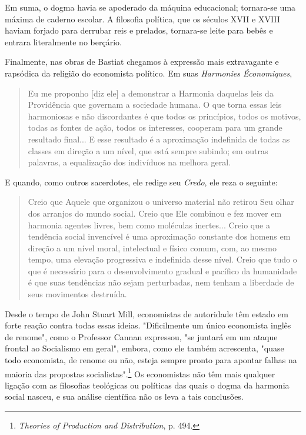 \documentclass[12pt]{article}
\begin{document}
Em suma, o dogma havia se apoderado da máquina educacional; tornara-se uma máxima de caderno escolar. A filosofia política, que os séculos XVII e XVIII haviam forjado para derrubar reis e prelados, tornara-se leite para bebês e entrara literalmente no berçário.

Finalmente, nas obras de Bastiat chegamos à expressão mais extravagante e rapsódica da religião do economista político. Em suas \textit{Harmonies Économiques},

\begin{quote}
Eu me proponho [diz ele] a demonstrar a Harmonia daquelas leis da Providência que governam a sociedade humana. O que torna essas leis harmoniosas e não discordantes é que todos os princípios, todos os motivos, todas as fontes de ação, todos os interesses, cooperam para um grande resultado final... E esse resultado é a aproximação indefinida de todas as classes em direção a um nível, que está sempre subindo; em outras palavras, a equalização dos indivíduos na melhora geral.
\end{quote}

E quando, como outros sacerdotes, ele redige seu \textit{Credo}, ele reza o seguinte:

\begin{quote}
Creio que Aquele que organizou o universo material não retirou Seu olhar dos arranjos do mundo social. Creio que Ele combinou e fez mover em harmonia agentes livres, bem como moléculas inertes... Creio que a tendência social invencível é uma aproximação constante dos homens em direção a um nível moral, intelectual e físico comum, com, ao mesmo tempo, uma elevação progressiva e indefinida desse nível. Creio que tudo o que é necessário para o desenvolvimento gradual e pacífico da humanidade é que suas tendências não sejam perturbadas, nem tenham a liberdade de seus movimentos destruída.
\end{quote}

Desde o tempo de John Stuart Mill, economistas de autoridade têm estado em forte reação contra todas essas ideias. "Dificilmente um único economista inglês de renome", como o Professor Cannan expressou, "se juntará em um ataque frontal ao Socialismo em geral", embora, como ele também acrescenta, "quase todo economista, de renome ou não, esteja sempre pronto para apontar falhas na maioria das propostas socialistas".\footnote{\textit{Theories of Production and Distribution}, p. 494.} Os economistas não têm mais qualquer ligação com as filosofias teológicas ou políticas das quais o dogma da harmonia social nasceu, e sua análise científica não os leva a tais conclusões.
\end{document}
